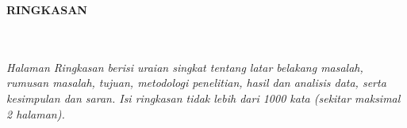 \clearpage
{}%
\thispagestyle{fancy}

\begin{center}
	\large \bfseries \MakeUppercase{Ringkasan}\\
	\normalsize \normalfont {\thetitle}\\
	\normalsize \normalfont {\theauthor}\\
	\bigskip
	
	\normalsize \normalfont \justifying
	\normalsize \normalfont \justifying
	\textit{Halaman Ringkasan berisi uraian singkat tentang latar belakang masalah, rumusan masalah, tujuan, metodologi penelitian, hasil dan analisis data, serta kesimpulan dan saran. Isi ringkasan tidak lebih dari 1000 kata (sekitar maksimal 2 halaman).}\par
	\lipsum[1-2] %

	\vfill
	
\end{center}
\clearpage